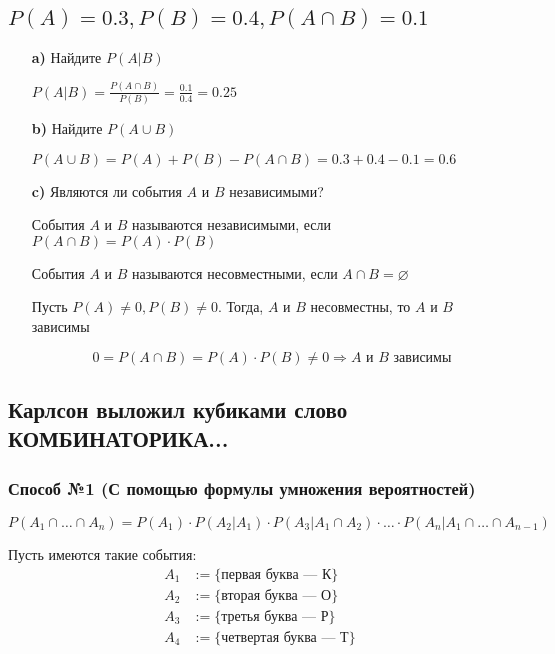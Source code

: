 \documentclass{article}
\begin{document}
\subsection{$P(A)=0.3,P(B)=0.4,P(A\cap B)=0.1$}
\begin{enumerate}
    \item[\textbf{a)}] Найдите $P(A|B)$
    
    $P(A|B)=\displaystyle\frac{P(A\cap B)}{P(B)}=\frac{0.1}{0.4}=0.25$
    \item[\textbf{b)}] Найдите $P(A\cup B)$
    
    $P(A\cup B)=P(A)+P(B)-P(A\cap B)=0.3+0.4-0.1=0.6$
    \item[\textbf{c)}] Являются ли события $A$ и $B$ независимыми?

     События $A$ и $B$ называются независимыми, если $P(A\cap B)=P(A)\cdot P(B)$

     События $A$ и $B$ называются несовместными, если $A\cap B=\varnothing$

    Пусть $P(A)\ne0,P(B)\ne0$. Тогда, $A$ и $B$ несовместны, то $A$ и $B$ зависимы

    $$0=P(A\cap B)=P(A)\cdot P(B)\ne0\Longrightarrow A \text{ и } B \text{ зависимы}$$
\end{enumerate}

\subsection{Карлсон выложил кубиками слово КОМБИНАТОРИКА...}
\subsubsection*{Способ №1 (С помощью формулы умножения вероятностей)}
$P(A_1\cap \ldots \cap A_n)=P(A_1)\cdot P(A_2|A_1)\cdot P(A_3|A_1\cap A_2)\cdot\ldots\cdot P(A_n|A_1\cap\ldots\cap A_{n-1})$



Пусть имеются такие события: \begin{equation*}
    \begin{aligned}
        A_1&:=\{\text{первая буква — К}\}\\
        A_2&:=\{\text{вторая буква — О}\}\\
        A_3&:=\{\text{третья буква — Р}\}\\
        A_4&:=\{\text{четвертая буква — Т}\}
    \end{aligned}
\end{equation*}
\end{document}
